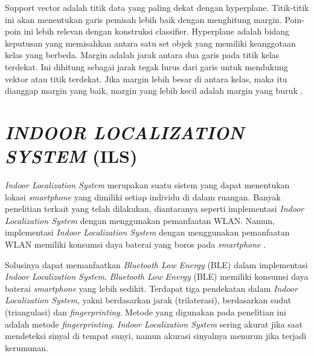 \par Support vector adalah titik data yang paling dekat dengan hyperplane. Titik-titik ini akan menentukan garis pemisah lebih baik dengan menghitung margin. Poin-poin ini lebih relevan dengan konstruksi classifier. Hyperplane adalah bidang keputusan yang memisahkan antara satu set objek yang memiliki keanggotaan kelas yang berbeda. Margin adalah jarak antara dua garis pada titik kelas terdekat. Ini dihitung sebagai jarak tegak lurus dari garis untuk mendukung vektor atau titik terdekat. Jika margin lebih besar di antara kelas, maka itu dianggap margin yang baik, margin yang lebih kecil adalah margin yang buruk \citep{Zhibin2008}.








\section{\uppercase{\textit{INDOOR LOCALIZATION SYSTEM} (ILS)}}
\textit{Indoor Localization System} merupakan suatu sistem yang dapat menentukan lokasi \textit{smartphone} yang dimiliki setiap individu di dalam ruangan. Banyak penelitian terkait yang telah dilakukan, diantaranya seperti implementasi \textit{Indoor Localization System} dengan menggunakan pemanfaatan WLAN. Namun, implementasi \textit{Indoor Localization System} dengan menggunakan pemanfaatan WLAN memiliki konsumsi daya baterai yang boros pada \textit{smartphone} \citep{Sun2019}.
\par Solusinya dapat memanfaatkan \textit{Bluetooth Low Energy }(BLE) dalam implementasi \textit{Indoor Localization System}. \textit{Bluetooth Low Energy }(BLE) memiliki konsumsi daya baterai \textit{smartphone} yang lebih sedikit. Terdapat tiga pendekatan dalam \textit{Indoor Localization System}, yakni berdasarkan jarak (trilaterasi), berdasarkan sudut (triangulasi) dan \textit{fingerprinting}. Metode yang digunakan pada penelitian ini adalah metode \textit{fingerprinting}. \textit{Indoor Localization System} sering akurat jika saat mendeteksi sinyal di tempat sunyi, namun akurasi sinyalnya menurun jika terjadi kerumunan\citep{Santos2021}.

